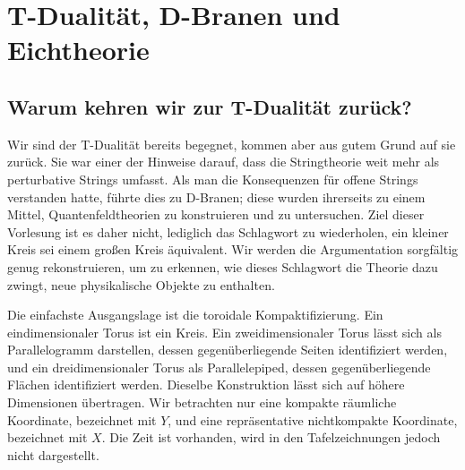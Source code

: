 \chapter{T-Dualität, D-Branen und Eichtheorie}


\section{Warum kehren wir zur T-Dualität zurück?}

Wir sind der T-Dualität bereits begegnet, kommen aber aus gutem Grund auf sie zurück. Sie war einer der Hinweise darauf, dass die Stringtheorie weit mehr als perturbative Strings umfasst. Als man die Konsequenzen für offene Strings verstanden hatte, führte dies zu D-Branen; diese wurden ihrerseits zu einem Mittel, Quantenfeldtheorien zu konstruieren und zu untersuchen. Ziel dieser Vorlesung ist es daher nicht, lediglich das Schlagwort zu wiederholen, ein kleiner Kreis sei einem großen Kreis äquivalent. Wir werden die Argumentation sorgfältig genug rekonstruieren, um zu erkennen, wie dieses Schlagwort die Theorie dazu zwingt, neue physikalische Objekte zu enthalten.

Die einfachste Ausgangslage ist die toroidale Kompaktifizierung. Ein eindimensionaler Torus ist ein Kreis. Ein zweidimensionaler Torus lässt sich als Parallelogramm darstellen, dessen gegenüberliegende Seiten identifiziert werden, und ein dreidimensionaler Torus als Parallelepiped, dessen gegenüberliegende Flächen identifiziert werden. Dieselbe Konstruktion lässt sich auf höhere Dimensionen übertragen. Wir betrachten nur eine kompakte räumliche Koordinate, bezeichnet mit \(Y\), und eine repräsentative nichtkompakte Koordinate, bezeichnet mit \(X\). Die Zeit ist vorhanden, wird in den Tafelzeichnungen jedoch nicht dargestellt.

